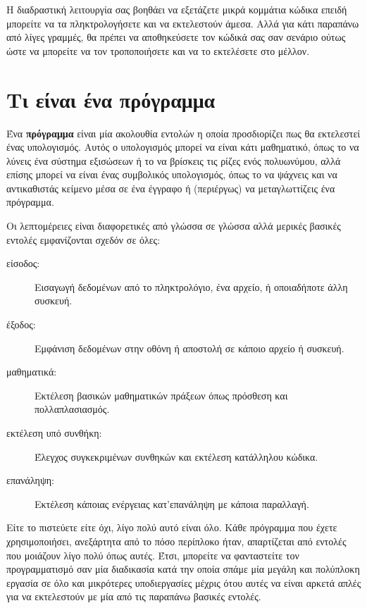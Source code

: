 \documentclass[10pt]{book}
\begin{document}

Η διαδραστική λειτουργία σας βοηθάει να εξετάζετε μικρά κομμάτια κώδικα επειδή μπορείτε να τα πληκτρολογήσετε και να εκτελεστούν άμεσα. Αλλά για κάτι παραπάνω από λίγες γραμμές, θα πρέπει να αποθηκεύσετε τον κώδικά σας σαν σενάριο ούτως ώστε να μπορείτε να τον τροποποιήσετε και να το εκτελέσετε στο μέλλον.


\section{Τι είναι ένα πρόγραμμα}

Ένα {\bf πρόγραμμα} είναι μία ακολουθία εντολών η οποία προσδιορίζει
πως θα εκτελεστεί ένας υπολογισμός. Αυτός ο υπολογισμός μπορεί να είναι
κάτι μαθηματικό, όπως το να λύνεις ένα σύστημα εξισώσεων ή το να βρίσκεις
τις ρίζες ενός πολυωνύμου, αλλά επίσης μπορεί να είναι ένας συμβολικός
υπολογισμός, όπως το να ψάχνεις και να αντικαθιστάς κείμενο μέσα σε ένα
έγγραφο ή (περιέργως) να μεταγλωττίζεις ένα πρόγραμμα.


Οι λεπτομέρειες είναι διαφορετικές από γλώσσα σε γλώσσα αλλά μερικές βασικές
εντολές εμφανίζονται σχεδόν σε όλες:

\begin{description}
\item[είσοδος:] Εισαγωγή δεδομένων από το πληκτρολόγιο, ένα αρχείο, ή οποιαδήποτε άλλη συσκευή.

\item[έξοδος:] Εμφάνιση δεδομένων στην οθόνη ή αποστολή σε κάποιο αρχείο
ή συσκευή.

\item[μαθηματικά:] Εκτέλεση βασικών μαθηματικών πράξεων όπως πρόσθεση και
πολλαπλασιασμός.

\item[εκτέλεση υπό συνθήκη:] Έλεγχος συγκεκριμένων συνθηκών και εκτέλεση κατάλληλου κώδικα.

\item[επανάληψη:] Εκτέλεση κάποιας ενέργειας κατ'επανάληψη με κάποια παραλλαγή.

\end{description}

Είτε το πιστεύετε είτε όχι, λίγο πολύ αυτό είναι όλο. Κάθε πρόγραμμα
που έχετε χρησιμοποιήσει, ανεξάρτητα από το πόσο περίπλοκο ήταν,
απαρτίζεται από εντολές που μοιάζουν λίγο πολύ όπως αυτές. Έτσι,
μπορείτε να φανταστείτε τον προγραμματισμό σαν μία διαδικασία κατά
την οποία σπάμε μία μεγάλη και πολύπλοκη εργασία σε όλο και μικρότερες
υποδιεργασίες μέχρις ότου αυτές να είναι αρκετά απλές για
να εκτελεστούν με μία από τις παραπάνω βασικές εντολές.
\end{document}
